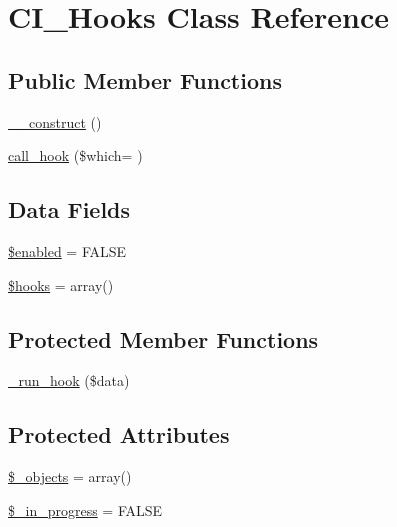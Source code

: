 \hypertarget{class_c_i___hooks}{}\section{C\+I\+\_\+\+Hooks Class Reference}
\label{class_c_i___hooks}
\subsection*{Public Member Functions}
\begin{DoxyCompactItemize}
\item 
\hyperlink{class_c_i___hooks_a095c5d389db211932136b53f25f39685}{\+\_\+\+\_\+construct} ()
\item 
\hyperlink{class_c_i___hooks_a813e988c1dc16db3e1e8a6f1434c4181}{call\+\_\+hook} (\$which= \textquotesingle{}\textquotesingle{})
\end{DoxyCompactItemize}
\subsection*{Data Fields}
\begin{DoxyCompactItemize}
\item 
\hyperlink{class_c_i___hooks_a8d376199cc641e3e7af6e1a0d5c736d9}{\$enabled} = F\+A\+L\+S\+E
\item 
\hyperlink{class_c_i___hooks_a05aec88c3516c6db5da524fbcc673aff}{\$hooks} = array()
\end{DoxyCompactItemize}
\subsection*{Protected Member Functions}
\begin{DoxyCompactItemize}
\item 
\hyperlink{class_c_i___hooks_a2cd07b3fcfaf153a37f164d3fbc7c3d9}{\+\_\+run\+\_\+hook} (\$data)
\end{DoxyCompactItemize}
\subsection*{Protected Attributes}
\begin{DoxyCompactItemize}
\item 
\hyperlink{class_c_i___hooks_a7f925b11c74f8a8aa0d4627c6f7844ce}{\$\+\_\+objects} = array()
\item 
\hyperlink{class_c_i___hooks_a6e8d0edcf7a4fb3e76c0f6d00e70053e}{\$\+\_\+in\+\_\+progress} = F\+A\+L\+S\+E
\end{DoxyCompactItemize}


